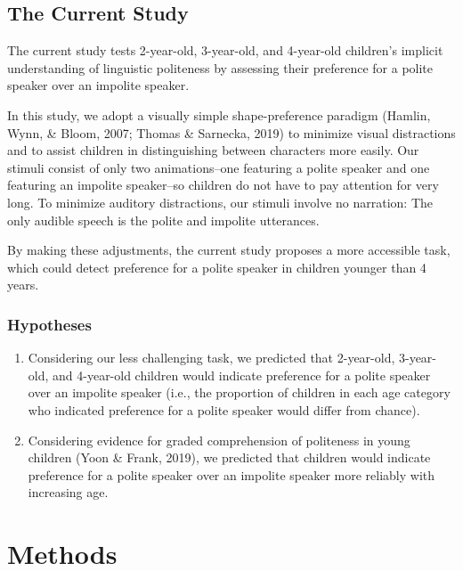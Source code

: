 \documentclass[
  english,
  man,floatsintext]{apa6}
\begin{document}
\newpage

\hypertarget{the-current-study}{%
\subsection{The Current Study}\label{the-current-study}}

The current study tests 2-year-old, 3-year-old, and 4-year-old children's implicit understanding of linguistic politeness by assessing their preference for a polite speaker over an impolite speaker.

In this study, we adopt a visually simple shape-preference paradigm (Hamlin, Wynn, \& Bloom, 2007; Thomas \& Sarnecka, 2019) to minimize visual distractions and to assist children in distinguishing between characters more easily. Our stimuli consist of only two animations--one featuring a polite speaker and one featuring an impolite speaker--so children do not have to pay attention for very long. To minimize auditory distractions, our stimuli involve no narration: The only audible speech is the polite and impolite utterances.

By making these adjustments, the current study proposes a more accessible task, which could detect preference for a polite speaker in children younger than 4 years.

\hypertarget{hypotheses}{%
\subsubsection{Hypotheses}\label{hypotheses}}

\begin{enumerate}
\def\labelenumi{\arabic{enumi}.}
\item
  Considering our less challenging task, we predicted that 2-year-old, 3-year-old, and 4-year-old children would indicate preference for a polite speaker over an impolite speaker (i.e., the proportion of children in each age category who indicated preference for a polite speaker would differ from chance).
\item
  Considering evidence for graded comprehension of politeness in young children (Yoon \& Frank, 2019), we predicted that children would indicate preference for a polite speaker over an impolite speaker more reliably with increasing age.
\end{enumerate}

\newpage

\hypertarget{methods}{%
\section{Methods}\label{methods}}
\end{document}
